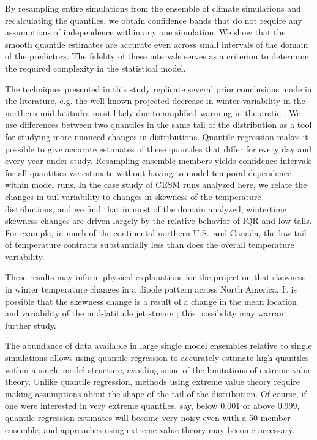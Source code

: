 \documentclass{ametsoc}
\begin{document}
By resampling entire simulations from the ensemble of climate simulations and recalculating the quantiles, we obtain confidence bands that do not require any assumptions of independence within any one simulation. We show that the smooth quantile estimates are accurate even across small intervals of the domain of the predictors. The fidelity of these intervals serves as a criterion to determine the required complexity in the statistical model.

The techniques presented in this study replicate several prior conclusions made in the literature, e.g. the well-known projected decrease in winter variability in the northern mid-latitudes \citep[e.g.][]{schneider2015physics} most likely due to amplified warming in the arctic \citep{screen2014arctic}. {We use differences between two quantiles in the same tail of the distribution as a tool for studying more nuanced changes in distributions. Quantile regression makes it possible to give accurate estimates of these quantiles that differ for every day and every year under study.  Resampling ensemble members yields confidence intervals for all quantities we estimate without having to model temporal dependence within model runs.} In the case study of CESM runs analyzed here, we relate the changes in tail variability to changes in skewness of the temperature distributions, and we find that in most of the domain analyzed, wintertime skewness changes are driven largely by the relative behavior of IQR and low tails. For example, in much of the continental northern U.S.\ and Canada, the low tail of temperature contracts substantially less than does the overall temperature variability. 

These results may inform physical explanations for 
the projection that skewness in winter temperature changes in a dipole pattern across North America. It is possible that the skewness change is a result of a change in the mean location and variability of the mid-latitude jet stream \citep[e.g.][]{barnes2013response}; this possibility may warrant further study.

The abundance of data available in large single model ensembles relative to single simulations allows using quantile regression to accurately estimate high quantiles within a single model structure, avoiding some of the limitations of extreme value theory. Unlike quantile regression, methods using extreme value theory require making assumptions about the shape of the tail of the distribution. {Of course, if one were interested in very extreme quantiles, say, below 0.001 or above 0.999, quantile regression estimates will become very noisy even with a 50-member ensemble, and approaches using extreme value theory may become necessary.}
\end{document}
